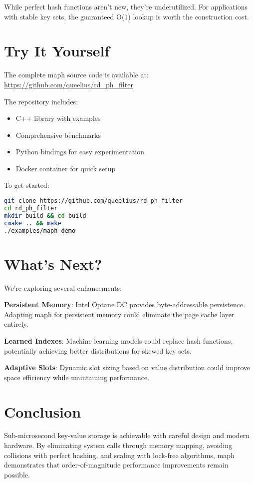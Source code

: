\documentclass[11pt]{article}
\begin{document}
While perfect hash functions aren't new, they're underutilized. For applications with stable key sets, the guaranteed O(1) lookup is worth the construction cost.

\section{Try It Yourself}

The complete maph source code is available at:
\url{https://github.com/queelius/rd_ph_filter}

The repository includes:
\begin{itemize}
\item C++ library with examples
\item Comprehensive benchmarks
\item Python bindings for easy experimentation
\item Docker container for quick setup
\end{itemize}

To get started:
\begin{lstlisting}[language=bash]
git clone https://github.com/queelius/rd_ph_filter
cd rd_ph_filter
mkdir build && cd build
cmake .. && make
./examples/maph_demo
\end{lstlisting}

\section{What's Next?}

We're exploring several enhancements:

\textbf{Persistent Memory}: Intel Optane DC provides byte-addressable persistence. Adapting maph for persistent memory could eliminate the page cache layer entirely.

\textbf{Learned Indexes}: Machine learning models could replace hash functions, potentially achieving better distributions for skewed key sets.

\textbf{Adaptive Slots}: Dynamic slot sizing based on value distribution could improve space efficiency while maintaining performance.

\section{Conclusion}

Sub-microsecond key-value storage is achievable with careful design and modern hardware. By eliminating system calls through memory mapping, avoiding collisions with perfect hashing, and scaling with lock-free algorithms, maph demonstrates that order-of-magnitude performance improvements remain possible.
\end{document}

